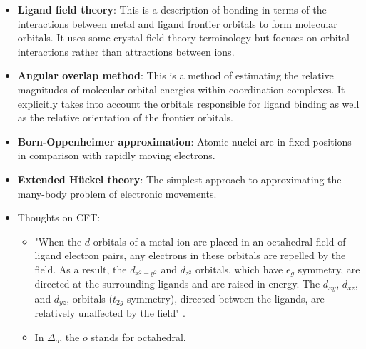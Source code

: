 \documentclass[../notes.tex]{subfiles}
\begin{document}
\begin{itemize}
    \item \textbf{Ligand field theory}: This is a description of bonding in terms of the interactions between metal and ligand frontier orbitals to form molecular orbitals. It uses some crystal field theory terminology but focuses on orbital interactions rather than attractions between ions.
    \item \textbf{Angular overlap method}: This is a method of estimating the relative magnitudes of molecular orbital energies within coordination complexes. It explicitly takes into account the orbitals responsible for ligand binding as well as the relative orientation of the frontier orbitals.
    \item \textbf{Born-Oppenheimer approximation}: Atomic nuclei are in fixed positions in comparison with rapidly moving electrons.
    \item \textbf{Extended H\"{u}ckel theory}: The simplest approach to approximating the many-body problem of electronic movements.
    \item Thoughts on CFT:
    \begin{itemize}
        \item "When the $d$ orbitals of a metal ion are placed in an octahedral field of ligand electron pairs, any electrons in these orbitals are repelled by the field. As a result, the $d_{x^2-y^2}$ and $d_{z^2}$ orbitals, which have $e_g$ symmetry, are directed at the surrounding ligands and are raised in energy. The $d_{xy}$, $d_{xz}$, and $d_{yz}$, orbitals ($t_{2g}$ symmetry), directed between the ligands, are relatively unaffected by the field" \parencite[364]{bib:MiesslerFischerTarr}.
        \item In $\Delta_o$, the $o$ stands for octahedral.
        \begin{figure}[h!]
            \centering
\end{figure}
\end{itemize}
\end{itemize}
\end{document}
